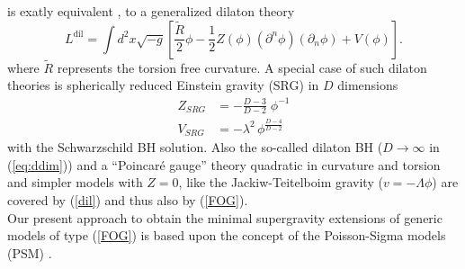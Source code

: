 \documentclass[a4paper,10pt]{article}
\newcommand{\half}{\frac{1}{2}}
\newcommand{\Action}{L}
\renewcommand{\^}{{}^}
\renewcommand{\_}{\!{}_}
\begin{document}
is exatly equivalent \cite{Katanaev:1993fu},\cite{Kummer:1997jj} 
to a generalized dilaton theory 
\begin{equation}
  \label{dil}
  \Action^{\mathrm{dil}} = \int d^2\!x \sqrt{-g}
  \left[
    \frac{\widetilde{R}}{2} \phi - \half Z(\phi) (\partial^n \phi)
    (\partial_n \phi) + V(\phi)
  \right].
\end{equation}
where $\tilde{R}$ represents the torsion free curvature. A 
special case of such dilaton theories is spherically reduced 
Einstein gravity (SRG) in $D$ dimensions 
\begin{equation}
\begin{split}
Z_{SRG} &= - \frac{D-3}{D-2} \; \phi^{-1}\\
V_{SRG} &= - \lambda^2\, \phi^{\frac{D-4}{D-2}}
\end{split}
\label{eq:ddim}
\end{equation}
with the Schwarzschild BH solution. Also the 
so-called dilaton BH \cite{Mandal:1991tz}
 ($D\to \infty$ in (\ref{eq:ddim})) and a
``Poincar\'e gauge'' \cite{Hehl:1995ue}  theory 
 quadratic in curvature 
and torsion \cite{Katanaev:1986wk} and simpler models with $Z=0$, like the 
Jackiw-Teitelboim gravity ($v=-\Lambda\phi$) \cite{jackiw84} are 
covered by (\ref{dil}) and thus also by (\ref{FOG}). \\
Our present approach to obtain the minimal supergravity 
extensions of generic models of type (\ref{FOG}) is based upon the 
concept of the Poisson-Sigma models (PSM)  
\cite{Schaller:1994es,Ikeda:1994aa,Schaller:1994uj}. 
 
\end{document}
